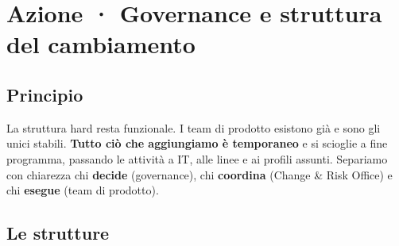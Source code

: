 \documentclass[11pt,a4paper]{article}
\begin{document}
\section{Azione · Governance e struttura del cambiamento}\label{sec:8}

\subsection{Principio}\label{sec:8.1}
La struttura hard resta funzionale. I team di prodotto esistono già e sono gli unici stabili. \textbf{Tutto ciò che aggiungiamo è temporaneo} e si scioglie a fine programma, passando le attività a IT, alle linee e ai profili assunti. Separiamo con chiarezza chi \textbf{decide} (governance), chi \textbf{coordina} (Change \& Risk Office) e chi \textbf{esegue} (team di prodotto).

\subsection{Le strutture}\label{sec:8.2}
\end{document}
